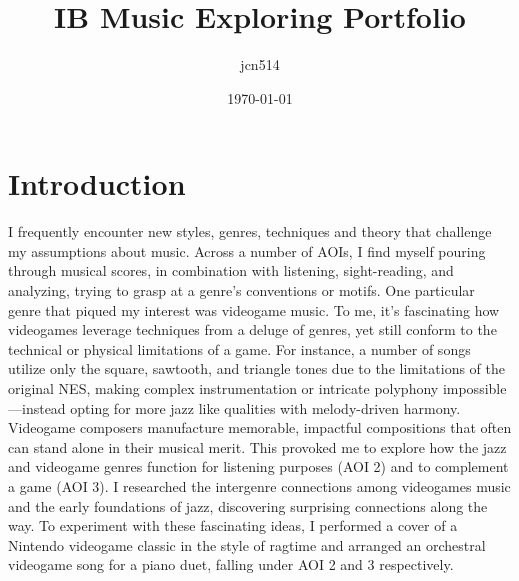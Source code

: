 \documentclass[11pt,a4paper]{article}
\author{jcn514}
\title{IB Music Exploring Portfolio}
\date{\today}
\begin{document}
\maketitle
\tableofcontents

\pagebreak

\section{Introduction}
I frequently encounter new styles, genres, techniques and theory that challenge my assumptions about music. Across a number of AOIs, I find myself pouring through musical scores, in combination with listening, sight-reading, and analyzing, trying to grasp at a genre’s conventions or motifs. One particular genre that piqued my interest was videogame music. To me, it’s fascinating how videogames leverage techniques from a deluge of genres, yet still conform to the technical or physical limitations of a game. For instance, a number of songs utilize only the square, sawtooth, and triangle tones due to the limitations of the original NES, making complex instrumentation or intricate polyphony impossible—instead opting for more jazz like qualities with melody-driven harmony.\autocite{collins_2007} Videogame composers manufacture memorable, impactful compositions that often can stand alone in their musical merit. This provoked me to explore how the jazz and videogame genres function for listening purposes (AOI 2) and to complement a game (AOI 3). I researched the intergenre connections among videogames music and the early foundations of jazz, discovering surprising connections along the way. To experiment with these fascinating ideas, I performed a cover of a Nintendo videogame classic in the style of ragtime and arranged an orchestral videogame song for a piano duet, falling under AOI 2 and 3 respectively.
\end{document}
